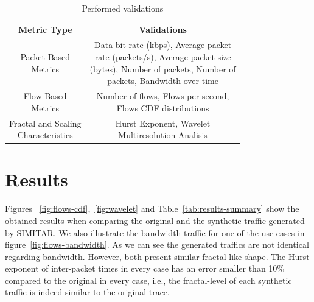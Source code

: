 \begin{table}[!htb]
	\centering
	\caption{Performed validations}
		\begin{tabular}{c c}
			\toprule
			\textbf{Metric Type} & \textbf{Validations} \\
			\midrule
			\makecell{Packet Based \\Metrics}                & \makecell{Data bit rate (kbps), Average packet\\
				rate (packets/s), Average packet size\\
				(bytes), Number of packets, Number of\\
				packets, Bandwidth over time}\\
			
			\makecell{Flow Based \\ Metrics}                & \makecell{Number of flows, Flows per second, \\
				Flows CDF distributions}\\
			
			\makecell{Fractal and Scaling \\ Characteristics} & \makecell{Hurst Exponent, Wavelet \\
				Multiresolution Analisis}\\
			\bottomrule
		\end{tabular}
	\label{tab:validation-tests-performed}
\end{table}


\section{Results}


Figures ~\ref{fig:flows-cdf},~\ref{fig:wavelet} and Table~\ref{tab:results-summary} show the obtained results when comparing the original and the synthetic traffic generated by SIMITAR. We also illustrate the bandwidth traffic for one of the use cases in figure~\ref{fig:flows-bandwidth}. As we can see the generated traffics are not identical regarding bandwidth. However, both present similar fractal-like shape. The Hurst exponent of inter-packet times in every case has an error smaller than 10\% compared to the original in every case, i.e., the fractal-level of each synthetic traffic is indeed similar to the original trace.

